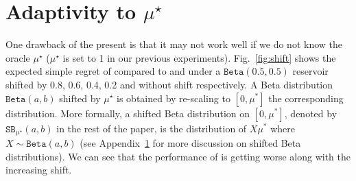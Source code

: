 \section{Adaptivity to \texorpdfstring{$\mu^\star$}{}}\label{app:dttts.adapt}

One drawback of the present \DTTTS{} is that it may not work well if we do not know the oracle $\mu^\star$ ($\mu^\star$ is set to 1 in our previous experiments). Fig.~\ref{fig:shift} shows the expected simple regret of \DTTTS compared to \ISHA and \TTTS under a $\texttt{Beta}(0.5,0.5)$ reservoir shifted by 0.8, 0.6, 0.4, 0.2 and without shift respectively. A Beta distribution $\texttt{Beta}(a,b)$ shifted by $\mu^\star$ is obtained by re-scaling to $[0,\mu^*]$ the corresponding distribution. More formally, a shifted Beta distribution on $[0,\mu^*]$, denoted by  $\texttt{SB}_{\mu^\star}(a,b)$ in the rest of the paper, is the distribution of $X\mu^*$ where $X \sim \texttt{Beta}(a,b)$ (see Appendix~\ref{app:dttts.adapt} for more discussion on shifted Beta distributions). We can see that the performance of \DTTTS is getting worse along with the increasing shift.

